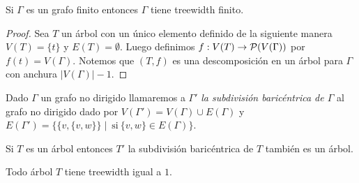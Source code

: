 \documentclass[tesis.tex]{subfiles}
\begin{document}
\begin{lema}
	Si $\Gamma$ es un grafo finito entonces $\Gamma$ tiene treewidth finito. 
\end{lema}
\begin{proof}
	Sea $T$ un árbol con un único elemento definido de la siguiente manera $V(T) = \{ t \}$ y $E(T) = \emptyset$.
	Luego definimos $f: V(T) \to {\cal{P}}(V(\Gamma))$ por $f(t) = V(\Gamma)$.
	Notemos que $(T,f)$ es una descomposición en un árbol para $\Gamma$ con anchura $|V(\Gamma)| - 1$.	
\end{proof}



\begin{deff}
	Dado $\Gamma$ un grafo no dirigido llamaremos a $\Gamma'$ \emph{la subdivisión baricéntrica de $\Gamma$ }al grafo no dirigido dado por
	$V(\Gamma') = V(\Gamma) \cup E(\Gamma)$ y $E(\Gamma') = \{ \{ v, \{v,w \} \} \mid \ \text{si} \ \{ v,w \} \in E(\Gamma) \}$.
\end{deff}




\begin{obs}\label{obs_sub_bari_arbol}
	Si $T$ es un árbol entonces $T'$ la subdivisión baricéntrica de $T$ también es un árbol.
\end{obs}

\begin{prop}\label{desc-arbol-arbol}
	Todo árbol $T$ tiene treewidth igual a  $1$.
\end{prop}
\end{document}
